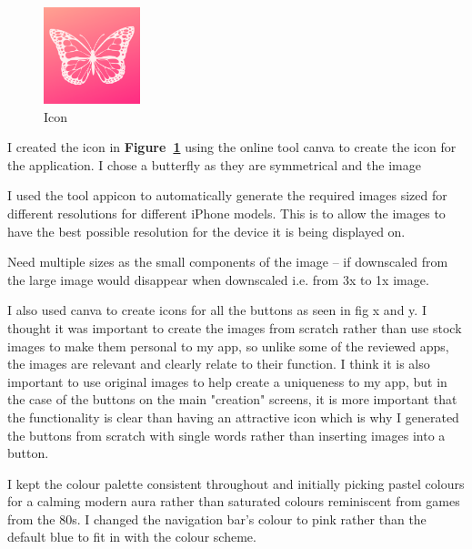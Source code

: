 \documentclass[11pt]{article}
\begin{document}
        \begin{figure}
                        \centering
                        \includegraphics[width=0.25\textwidth]{KiriZen/icon.png}
                        \caption{Icon}
                        \label{fig:icon}
                    \end{figure}
            I created the icon in \textbf{Figure~\ref{fig:icon}} using the online tool canva %
            to create the icon for the application. I chose a butterfly as they are symmetrical and the image
            
            I used the tool appicon %
            to automatically generate the required images sized for different resolutions for different iPhone models. This is to allow the images to have the best possible resolution for the device it is being displayed on.  
            
            Need multiple sizes as the small components of the image – if downscaled from the large image would disappear when downscaled i.e. from 3x to 1x image. 
        
            I also used canva to create icons for all the buttons as  seen in fig x and y. I thought it was important to create the images from scratch rather than use stock images to make them personal to my app, so unlike some of the reviewed apps, the images are relevant and clearly relate to their function. I think it is also important to use original images to help create a uniqueness to my app, but in the case of the buttons on the main "creation" screens, it is more important that the functionality is clear than having an attractive icon which is why I generated the buttons from scratch with single words rather than inserting images into a button.
            
            I kept the colour palette consistent throughout and initially picking pastel colours for a calming modern  aura rather than saturated colours reminiscent from games from the 80s. I changed the navigation bar's colour to pink rather than the default blue to fit in with the colour scheme. 
    
\end{document}

